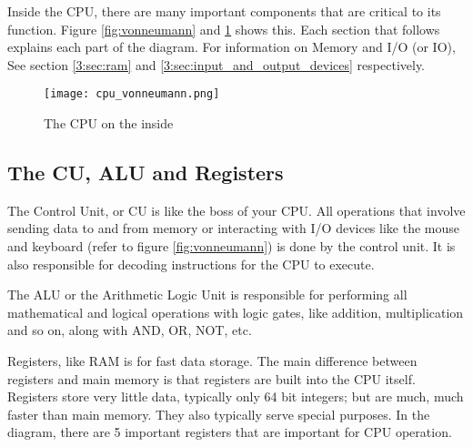 \documentclass[../main.tex]{subfiles}
\begin{document}
Inside the CPU, there are many important components that are critical to its function. Figure \ref{fig:vonneumann} and \ref{fig:cpu_vonneumann} shows this. Each section that follows explains each part of the diagram. For information on Memory and I/O (or IO), See section \ref{3:sec:ram} and \ref{3:sec:input_and_output_devices} respectively.

\begin{figure}[H]
    \centering
    \texttt{[image: cpu\_vonneumann.png]}
    \caption{The CPU on the inside}
    \label{fig:cpu_vonneumann}
\end{figure}

\subsection{The CU, ALU and Registers}

The Control Unit, or CU is like the boss of your CPU. All operations that involve sending data to and from memory or interacting with I/O devices like the mouse and keyboard (refer to figure \ref{fig:vonneumann}) is done by the control unit. It is also responsible for decoding instructions for the CPU to execute.

The ALU or the Arithmetic Logic Unit is responsible for performing all mathematical and logical operations with logic gates, like addition, multiplication and so on, along with AND, OR, NOT, etc.

Registers, like RAM is for fast data storage. The main difference between registers and main memory is that registers are built into the CPU itself. Registers store very little data, typically only 64 bit integers; but are much, much faster than main memory. They also typically serve special purposes. In the diagram, there are 5 important registers that are important for CPU operation.
\end{document}
